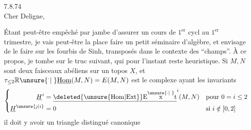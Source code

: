 
  7.8.74\\
Cher Deligne,\\


Étant peut-être empêché par  jambe d'assurer un cours de $1^{\mathrm{er}}$ cycl au $1^{\mathrm{er}}$ trimestre, je vais peut-être  la place faire un petit séminaire d'algèbre, et envisage de le faire sur les fourbis de  Sinh,  transposés dans le contexte des ``champs''. À ce propos, je tombe sur le truc suivant, qui pour l'instant reste heuristique. Si $M,N$ sont deux faisceaux abéliens sur un topos $X$, et $\tau_{\leq 2}\mathbb{R}\unsure{{}^{\cdot}|\phantom{{}^{\cdot}}}\underline{\mathrm{Hom}}(M,N)=E(M,N)$ est le complexe ayant les invariants
\[
\left\{\begin{aligned}
\underline{H}^{i}&=\underline{\deleted{\unsure{\mathrm{Hom}|\mathrm{Ext}}}\mathrm{E}\overset{\unsure{\cdot|\phantom{\cdot}}}{\mathrm{x}}\mathrm{t}}^{i}(M,N) &&\text{pour }0=i\leq 2\\
\underline{H}^{\unsure{j|i}}&=0 &&\text{si }i\notin[0,2]
\end{aligned}\right.
\]
il doit y avoir un triangle distingué canonique

